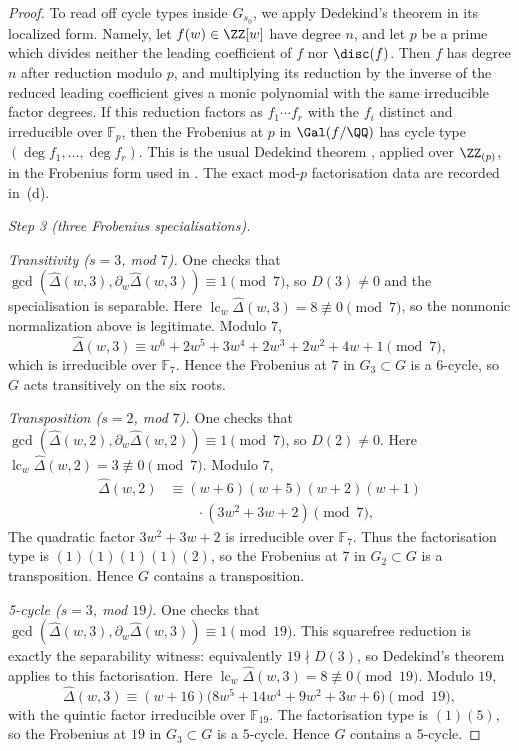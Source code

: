 \begin{proof}
To read off cycle types inside \(G_{s_0}\), we apply Dedekind's
theorem in its localized form. Namely, let
\(f(w)\in\ZZ[w]\) have degree \(n\), and let \(p\) be a prime
which divides neither the leading coefficient of \(f\) nor
\(\disc(f)\). Then \(f\) has degree \(n\) after reduction modulo
\(p\), and multiplying its reduction by the inverse of the reduced
leading coefficient gives a monic polynomial with the same irreducible
factor degrees. If this reduction factors as
\(f_1\cdots f_r\) with the \(f_i\) distinct and irreducible over
\(\mathbb{F}_p\), then the Frobenius at \(p\) in \(\Gal(f/\QQ)\)
has cycle type \((\deg f_1,\dots,\deg f_r)\). This is the usual
Dedekind theorem \cite[I, \S{}6, Proposition~25]{Serre1979}, applied
over \(\ZZ_{(p)}\), in the Frobenius form used in
\cite[\S{}4.3]{Serre2008Topics}. The exact mod-\(p\) factorisation
data are recorded in \,(d).

\medskip
\noindent\textit{Step 3 (three Frobenius specialisations).}

\smallskip
\noindent\textit{Transitivity (\(s=3\), mod \(7\)).}\quad
One checks that
\(\gcd(\widehat\Delta(w,3),\partial_w\widehat\Delta(w,3))\equiv 1\pmod 7\),
so \(D(3)\neq 0\) and the specialisation is separable.
Here \(\operatorname{lc}_w\widehat\Delta(w,3)=8\not\equiv0\pmod7\),
so the nonmonic normalization above is legitimate.
Modulo \(7\),
\[
  \widehat\Delta(w,3)
  \equiv w^6+2w^5+3w^4+2w^3+2w^2+4w+1\pmod 7,
\]
which is irreducible over \(\mathbb{F}_7\). Hence the Frobenius at \(7\)
in \(G_3\subset G\) is a \(6\)-cycle, so \(G\) acts transitively
on the six roots.

\smallskip
\noindent\textit{Transposition (\(s=2\), mod \(7\)).}\quad
One checks that
\(\gcd(\widehat\Delta(w,2),\partial_w\widehat\Delta(w,2))\equiv 1\pmod 7\),
so \(D(2)\neq 0\). Here
\(\operatorname{lc}_w\widehat\Delta(w,2)=3\not\equiv0\pmod7\).
Modulo \(7\),
\[
\begin{aligned}
  \widehat\Delta(w,2)
  &\equiv (w+6)(w+5)(w+2)(w+1) \\
  &\qquad\cdot(3w^2+3w+2)\pmod 7,
\end{aligned}
\]
The quadratic factor \(3w^2+3w+2\) is irreducible over
\(\mathbb{F}_7\). Thus the factorisation type is
\((1)(1)(1)(1)(2)\), so the Frobenius at \(7\) in \(G_2\subset G\) is a
transposition. Hence \(G\) contains a transposition.

\smallskip
\noindent\textit{5-cycle (\(s=3\), mod \(19\)).}\quad
One checks that
\(\gcd(\widehat\Delta(w,3),\partial_w\widehat\Delta(w,3))\equiv 1\pmod{19}\).
This squarefree reduction is exactly the separability witness:
equivalently \(19\nmid D(3)\), so Dedekind's theorem applies to this
factorisation.
Here \(\operatorname{lc}_w\widehat\Delta(w,3)=8\not\equiv0\pmod{19}\).
Modulo \(19\),
\[
  \widehat\Delta(w,3)
  \equiv (w+16)\bigl(8w^5+14w^4+9w^2+3w+6\bigr)\pmod{19},
\]
with the quintic factor irreducible over \(\mathbb{F}_{19}\). The
factorisation type is \((1)(5)\), so the Frobenius at \(19\) in
\(G_3\subset G\) is a \(5\)-cycle. Hence \(G\) contains a
\(5\)-cycle.


\end{proof}
